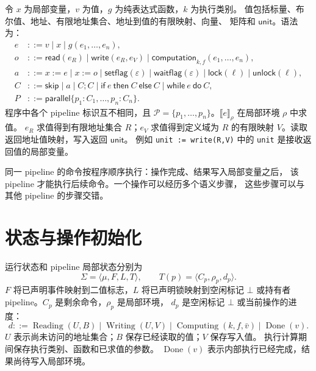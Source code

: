 \documentclass[UTF8,a4paper,11pt,fontset=fandol]{ctexart}
\newcommand{\code}{\nolinkurl}
\newcommand{\sem}[1]{\llbracket #1\rrbracket}
\newcommand{\kw}[1]{\mathsf{#1}}
\newcommand{\Read}{\operatorname{Reading}}
\newcommand{\Write}{\operatorname{Writing}}
\newcommand{\Compute}{\operatorname{Computing}}
\newcommand{\Done}{\operatorname{Done}}
\begin{document}
令 $x$ 为局部变量，$v$ 为值，$g$ 为纯表达式函数，$k$ 为执行类别。
值包括标量、布尔值、地址、有限地址集合、地址到值的有限映射、向量、
矩阵和 $\kw{unit}$。语法为：
\[
\begin{aligned}
e &::=v\mid x\mid g(e_1,\ldots,e_n),\\
o &::=\kw{read}(e_R)
  \mid\kw{write}(e_R,e_V)
  \mid\kw{computation}_{k,f}(e_1,\ldots,e_n),\\
a &::=x:=e\mid x:=o\mid\kw{setflag}(\varepsilon)
  \mid\kw{waitflag}(\varepsilon)
  \mid\kw{lock}(\ell)\mid\kw{unlock}(\ell),\\
C &::=\kw{skip}\mid a\mid C;C
  \mid\kw{if}\ e\ \kw{then}\ C\ \kw{else}\ C
  \mid\kw{while}\ e\ \kw{do}\ C,\\
P &::=\kw{parallel}\{p_1:C_1,\ldots,p_n:C_n\}.
\end{aligned}
\]
程序中各个 pipeline 标识互不相同，且
$\mathcal P=\{p_1,\ldots,p_n\}$。$\sem e_\rho$ 在局部环境 $\rho$ 中求值。
$e_R$ 求值得到有限地址集合 $R$；$e_V$ 求值得到定义域为 $R$ 的有限映射
$V$。读取返回地址值映射，写入返回 $\kw{unit}$。
例如 \code{unit := write(R,V)} 中的 \code{unit} 是接收返回值的局部变量。

同一 pipeline 的命令按程序顺序执行：操作完成、结果写入局部变量之后，
该 pipeline 才能执行后续命令。一个操作可以经历多个语义步骤，
这些步骤可以与其他 pipeline 的步骤交错。

\section{状态与操作初始化}

运行状态和 pipeline 局部状态分别为
\[
\Sigma=\langle\mu,F,L,T\rangle,\qquad
T(p)=\langle C_p,\rho_p,d_p\rangle.
\]
$F$ 将已声明事件映射到二值标志，$L$ 将已声明锁映射到空闲标记 $\bot$
或持有者 pipeline。$C_p$ 是剩余命令，$\rho_p$ 是局部环境，
$d_p$ 是空闲标记 $\bot$ 或当前操作的进度：
\[
d::=\Read(U,B)\mid\Write(U,V)\mid\Compute(k,f,\bar v)\mid\Done(v).
\]
$U$ 表示尚未访问的地址集合；$B$ 保存已经读取的值；$V$ 保存写入值。
执行计算期间保存执行类别、函数和已求值的参数。
$\Done(v)$ 表示内部执行已经完成，结果尚待写入局部环境。
\end{document}
